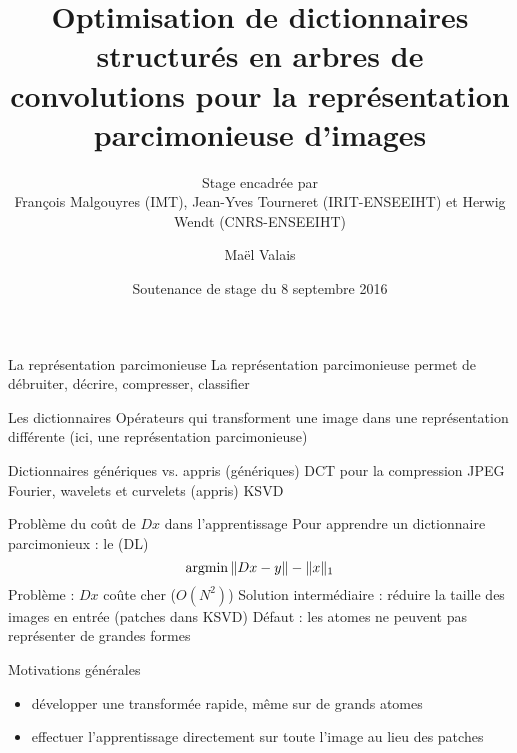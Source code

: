 


\title{Optimisation de dictionnaires structurés en arbres de convolutions pour la représentation parcimonieuse d'images}
\subtitle{Stage encadrée par\\François Malgouyres (IMT), Jean-Yves Tourneret (IRIT-ENSEEIHT) et Herwig Wendt (CNRS-ENSEEIHT)}

\date{Soutenance de stage du 8 septembre 2016}
\author{Maël Valais}



\maketitle



\begin{frame}[label=LO]{La représentation parcimonieuse}
La \alert{représentation parcimonieuse} permet de débruiter, décrire, compresser, classifier
\end{frame}


\begin{frame}{Les dictionnaires}
Opérateurs qui transforment une image dans une représentation différente (ici, une représentation parcimonieuse)
\end{frame}


\begin{frame}{Dictionnaires génériques vs. appris}
(génériques)
DCT pour la compression JPEG
Fourier, wavelets et curvelets 
(appris)
KSVD
\end{frame}


\begin{frame}{Problème du coût de $Dx$ dans l'apprentissage}
Pour apprendre un dictionnaire parcimonieux : le (DL)
\begin{equation}
	\operatorname{argmin} \| Dx - y \| - \|x\|_1
\end{equation}
Problème : $Dx$ coûte cher ($O(N^2)$)
Solution intermédiaire : réduire la taille des images en entrée (patches dans KSVD)
Défaut : les atomes ne peuvent pas représenter de grandes formes
\end{frame}


\begin{frame}{Motivations générales}
	\begin{itemize}
		\item développer une transformée rapide, même sur de grands atomes
		\item effectuer l'apprentissage directement sur toute l'image au lieu des patches
	\end{itemize}
\end{frame}


